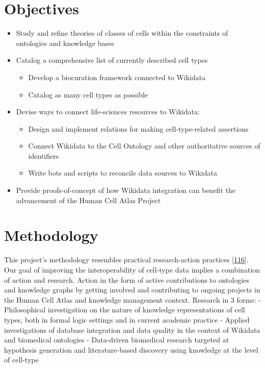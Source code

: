 \hypertarget{objectives}{%
\section{Objectives}\label{objectives}}

\begin{itemize}
\item
  Study and refine theories of classes of cells within the constraints of ontologies and knowledge bases
\item
  Catalog a comprehensive list of currently described cell types

  \begin{itemize}
  \tightlist
  \item
    Develop a biocuration framework connected to Wikidata
  \item
    Catalog as many cell types as possible
  \end{itemize}
\item
  Devise ways to connect life-sciences resources to Wikidata:

  \begin{itemize}
  \tightlist
  \item
    Design and implement relations for making cell-type-related assertions
  \item
    Connect Wikidata to the Cell Ontology and other authoritative sources of identifiers
  \item
    Write bots and scripts to reconcile data sources to Wikidata
  \end{itemize}
\item
  Provide proofs-of-concept of how Wikidata integration can benefit the advancement of the Human Cell Atlas Project
\end{itemize}

\hypertarget{methodology}{%
\section{Methodology}\label{methodology}}

This project's methodology resembles practical research-action practices {[}\protect\hyperlink{ref-11UV98PHT}{116}{]}.
Our goal of improving the interoperability of cell-type data implies a combination of action and research.
Action in the form of active contributions to ontologies and knowledge graphs by getting involved and contributing to ongoing projects in the Human Cell Atlas and knowledge management context.
Research in 3 forms:
- Philosophical investigation on the nature of knowledge representations of cell types, both in formal logic settings and in current academic practice
- Applied investigations of database integration and data quality in the context of Wikidata and biomedical ontologies
- Data-driven biomedical research targeted at hypothesis generation and literature-based discovery using knowledge at the level of cell-type

